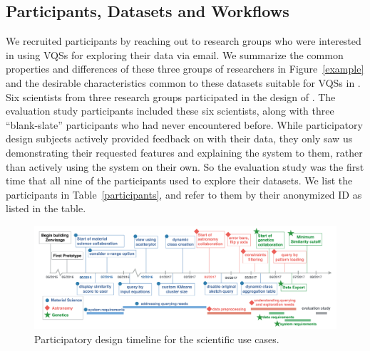\subsection{Participants, Datasets and Workflows}
We recruited participants by reaching out to research groups who were interested in using VQSs for exploring their data via email. We summarize the common properties and differences of these three groups of researchers in Figure~\ref{example} and the desirable characteristics common to these datasets suitable for VQSs in . Six scientists from three research groups participated in the design of \zv. The evaluation study participants included these six scientists, along with three ``blank-slate'' participants who had never encountered \zv before. While participatory design subjects actively provided feedback on \zv with their data, they only saw us demonstrating their requested features and explaining the system to them, rather than actively using the system on their own. So the evaluation study was the first time that all nine of the participants used \zv to explore their datasets. We list the participants in Table~\ref{participants}, and refer to them by their anonymized ID as listed in the table. 
\begin{figure}[ht!]
\centering
\vspace{-10pt}
\includegraphics[width=6in]{figures/timeline_new.pdf}
\vspace{-6pt}\caption{Participatory design timeline for the scientific use cases.}
\label{timeline}
\vspace{-10pt}
\end{figure}

